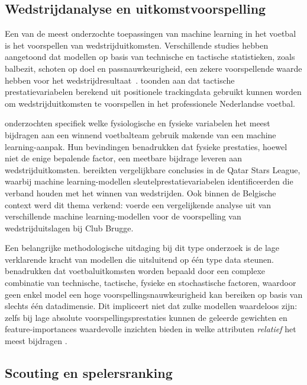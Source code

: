 \subsection{Wedstrijdanalyse en uitkomstvoorspelling}
 
Een van de meest onderzochte toepassingen van machine learning in het voetbal is het voorspellen van wedstrijduitkomsten. Verschillende studies hebben aangetoond dat modellen op basis van technische en tactische statistieken, zoals balbezit, schoten op doel en passnauwkeurigheid, een zekere voorspellende waarde hebben voor het wedstrijdresultaat~\autocite{BigData2024_SoccerOutcomePrediction}. \textcite{goes-2019} toonden aan dat tactische prestatievariabelen berekend uit positionele trackingdata gebruikt kunnen worden om wedstrijduitkomsten te voorspellen in het professionele Nederlandse voetbal.
 
\textcite{Cortez2021PredictingPV} onderzochten specifiek welke fysiologische en fysieke variabelen het meest bijdragen aan een winnend voetbalteam gebruik makende van een machine learning-aanpak. Hun bevindingen benadrukken dat fysieke prestaties, hoewel niet de enige bepalende factor, een meetbare bijdrage leveren aan wedstrijduitkomsten. \textcite{Almulla2020MachineLM} bereikten vergelijkbare conclusies in de Qatar Stars League, waarbij machine learning-modellen sleutelprestatievariabelen identificeerden die verband houden met het winnen van wedstrijden. Ook binnen de Belgische context werd dit thema verkend: \textcite{de-vulder-2024} voerde een vergelijkende analyse uit van verschillende machine learning-modellen voor de voorspelling van wedstrijduitslagen bij Club Brugge.
 
Een belangrijke methodologische uitdaging bij dit type onderzoek is de lage verklarende kracht van modellen die uitsluitend op één type data steunen. \textcite{DavisEtAl2024} benadrukken dat voetbaluitkomsten worden bepaald door een complexe combinatie van technische, tactische, fysieke en stochastische factoren, waardoor geen enkel model een hoge voorspellingsnauwkeurigheid kan bereiken op basis van slechts één datadimensie. Dit impliceert niet dat zulke modellen waardeloos zijn: zelfs bij lage absolute voorspellingsprestaties kunnen de geleerde gewichten en feature-importances waardevolle inzichten bieden in welke attributen \textit{relatief} het meest bijdragen \autocite{DavisEtAl2024}.

\subsection{Scouting en spelersranking}
 
